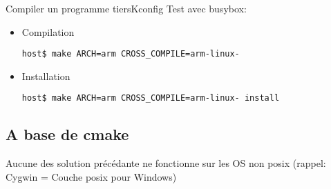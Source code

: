 \begin{frame}[fragile=singleslide]{Compiler un programme tiers}{Kconfig}
  Test avec busybox:
  \begin{itemize}
  \item Compilation
\begin{lstlisting}
host$ make ARCH=arm CROSS_COMPILE=arm-linux- 
\end{lstlisting} %
  \item Installation
\begin{lstlisting}
host$ make ARCH=arm CROSS_COMPILE=arm-linux- install
\end{lstlisting} %
  \end{itemize}
\end{frame}


\subsection{A base de cmake}
Aucune des solution précédante ne fonctionne sur les OS non posix (rappel: Cygwin = Couche posix pour Windows)



